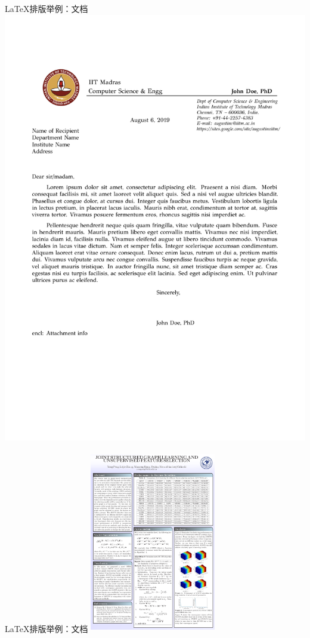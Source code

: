 \documentclass[UTF8,11pt]{ctexbeamer}
\begin{document}
\begin{frame}{\LaTeX 排版举例：文档}
	\includegraphics[scale=0.25]{figure/letter}
\end{frame}


\begin{frame}{\LaTeX 排版举例：文档}
	\centering
	\includegraphics[width=5.5cm,height=8cm]{figure/poster}
\end{frame}
\end{document}
